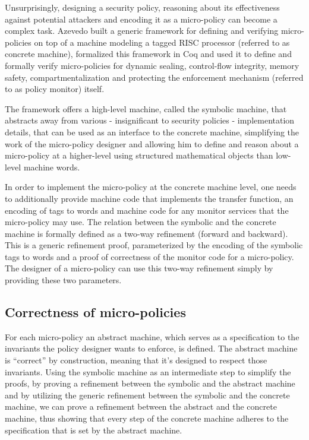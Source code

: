 Unsurprisingly, designing a security policy, reasoning about its
effectiveness against potential attackers and encoding it as a
micro-policy can become a complex task. Azevedo \ETAL
\cite{popl2015} built a generic framework for defining and
verifying micro-policies on top of a machine modeling a tagged RISC
processor (referred to as concrete machine), formalized this framework
in Coq and used it to define and formally verify micro-policies for
dynamic sealing, control-flow integrity, memory safety,
compartmentalization and protecting the enforcement mechanism
(referred to as policy monitor) itself.

The framework offers a high-level machine, called the symbolic
machine, that abstracts away from various - insignificant to security
policies - implementation details, that can be used as an interface to
the concrete machine, simplifying the work of the micro-policy
designer and allowing him to define and reason about a micro-policy at
a higher-level using structured mathematical objects than low-level
machine words.

In order to implement the micro-policy at the concrete machine level, one needs
to additionally provide machine code that implements the transfer function, an
encoding of tags to words and machine code for any monitor services that the
micro-policy may use. The relation between the symbolic and the concrete machine
is formally defined as a two-way refinement (forward and backward). This is a
generic refinement proof, parameterized by the encoding of the symbolic tags to
words and a proof of correctness of the monitor code for a micro-policy.
The designer of a micro-policy can use this two-way refinement simply by
providing these two parameters.

\subsection{Correctness of micro-policies}\label{sec:verification}

For each micro-policy an abstract machine, which serves as a
specification to the invariants the policy designer wants to enforce,
is defined. The abstract machine is ``correct'' by construction,
meaning that it's designed to respect those invariants. Using the
symbolic machine as an intermediate step to simplify the proofs, by
proving a refinement between the symbolic and the abstract machine and
by utilizing the generic refinement between the symbolic and the
concrete machine, we can prove a refinement between the abstract and
the concrete machine, thus showing that every step of the concrete
machine adheres to the specification that is set by the abstract
machine.

